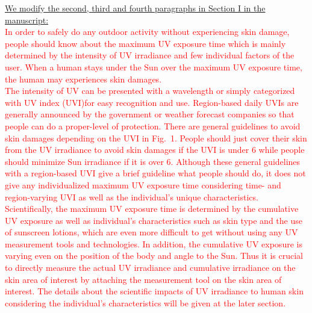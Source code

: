 \documentclass[onecolumn]{IEEEconf}
\begin{document}
\begin{description}
\underline{We modify the second, third and fourth paragraphs in Section I in the manuscript:}\\
\textcolor{red}{In order to safely do any outdoor activity without experiencing skin damage, people should know about the maximum UV exposure time which is mainly determined by the intensity of UV irradiance and few individual factors of the user. When a human stays under the Sun over the maximum UV exposure time, the human may experiences skin damages.}\\
%
\textcolor{red}{The intensity of UV can be presented with a wavelength or simply categorized with UV index (UVI)for easy recognition and use. Region-based daily UVIs are generally announced by the government or weather forecast companies so that people can do a proper-level of protection. There are general guidelines to avoid skin damages depending on the UVI in Fig.~1. People should just cover their skin from the UV irradiance to avoid skin damages if the UVI is under 6 while people should minimize Sun irradiance if it is over 6. Although these general guidelines with a region-based UVI give a brief guideline what people should do, it does not give any individualized maximum UV exposure time considering time- and region-varying UVI as well as the individual's unique characteristics.}\\
%
\textcolor{red}{Scientifically, the maximum UV exposure time is determined by the cumulative UV exposure as well as individual's characteristics such as skin type and the use of sunscreen lotions, which are even more difficult to get without using any UV measurement tools and technologies. In addition, the cumulative UV exposure is varying even on the position of the body and angle to the Sun. Thus it is crucial to directly measure the actual UV irradiance and cumulative irradiance on the skin area of interest by attaching the measurement tool on the skin area of interest. The details about the scientific impacts of UV irradiance to human skin considering the individual's characteristics will be given at the later section.}\\


\end{description}
\end{document}
